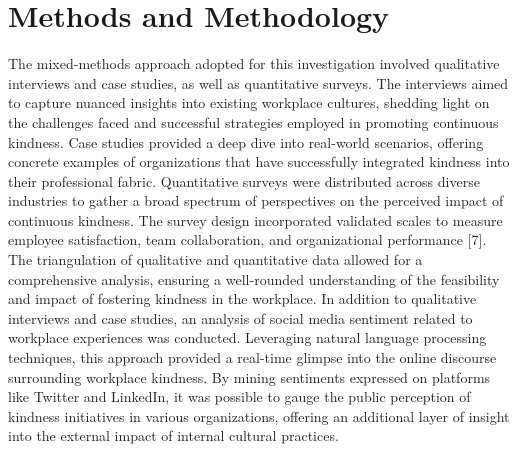 \documentclass[a4paper, 11pt]{report}
\begin{document}
\section{Methods and Methodology}
The mixed-methods approach adopted for this investigation involved qualitative interviews and case studies, as well as quantitative surveys. The interviews aimed to capture nuanced insights into existing workplace cultures, shedding light on the challenges faced and successful strategies employed in promoting continuous kindness. Case studies provided a deep dive into real-world scenarios, offering concrete examples of organizations that have successfully integrated kindness into their professional fabric.
\vspace{5mm} %
\newline
Quantitative surveys were distributed across diverse industries to gather a broad spectrum of perspectives on the perceived impact of continuous kindness. The survey design incorporated validated scales to measure employee satisfaction, team collaboration, and organizational performance [7]. The triangulation of qualitative and quantitative data allowed for a comprehensive analysis, ensuring a well-rounded understanding of the feasibility and impact of fostering kindness in the workplace.
\vspace{5mm} %
\newline
In addition to qualitative interviews and case studies, an analysis of social media sentiment related to workplace experiences was conducted. Leveraging natural language processing techniques, this approach provided a real-time glimpse into the online discourse surrounding workplace kindness. By mining sentiments expressed on platforms like Twitter and LinkedIn, it was possible to gauge the public perception of kindness initiatives in various organizations, offering an additional layer of insight into the external impact of internal cultural practices.
\end{document}

